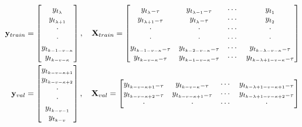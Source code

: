 \begin{align*}
    \mathbf{y}_{train} &=
    \begin{bmatrix}
        y_{t_\lambda}       \\
        y_{t_{\lambda + 1}} \\
        \cdot               \\
        \cdot               \\
        y_{t_{k-1 - v - \kappa}}         \\
        y_{t_{k - v - \kappa}}            
    \end{bmatrix}
    , \quad
    \mathbf{X}_{train} =
    \begin{bmatrix}
        y_{t_{\lambda} - \tau}   & y_{t_{\lambda-1} - \tau} & \cdots & y_{t_{1}} \\
        y_{t_{\lambda+1} - \tau} & y_{t_{\lambda} - \tau}   & \cdots & y_{t_{2}} \\
        \cdot                    & \cdot                    & \cdots & \cdot     \\
        \cdot                    & \cdot                    & \cdots & \cdot     \\
        y_{t_{k-1-v-\kappa}-\tau} & y_{t_{k-2-v-\kappa}-\tau} & \cdots & y_{t_{k-\lambda-v-\kappa}-\tau} \\
        y_{t_{k-v-\kappa}-\tau}   & y_{t_{k-1-v-\kappa}-\tau} & \cdots & y_{t_{k-\lambda+1-v-\kappa}-\tau}
    \end{bmatrix}\\
    \mathbf{y}_{val} &=
    \begin{bmatrix}
        y_{t_{k - v - \kappa + 1}}       \\
        y_{t_{k - v - \kappa + 2}} \\
        \cdot               \\
        \cdot               \\
        y_{t_{k - v - 1}}         \\
        y_{t_{k - v}}            
    \end{bmatrix}
    , \quad
    \mathbf{X}_{val} =
    \begin{bmatrix}
        y_{t_{k-v-\kappa+1}-\tau}   & y_{t_{k-v-\kappa}-\tau} & \cdots & y_{t_{k-\lambda+1-v-\kappa+1}-\tau} \\
        y_{t_{k-v-\kappa+2}-\tau} & y_{t_{k-v-\kappa+1}-\tau}   & \cdots & y_{t_{k-\lambda+1-v-\kappa+2}-\tau} \\
        \cdot                    & \cdot                    & \cdots & \cdot     \\

\end{bmatrix}
\end{align*}

